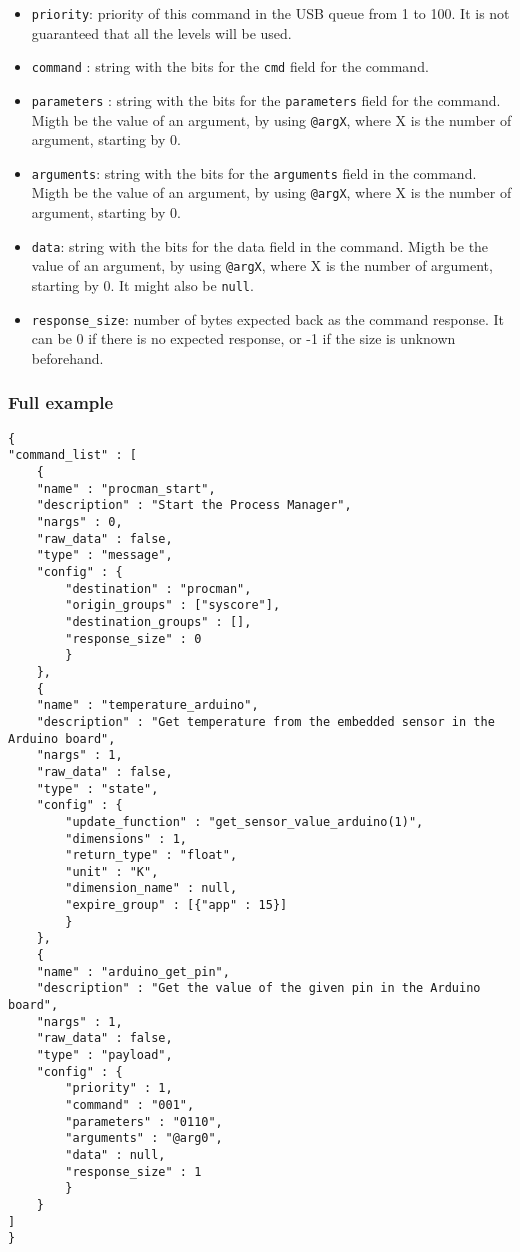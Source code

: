 \documentclass[12pt,a4paper]{report}
\begin{document}
\begin{itemize}
\item \texttt{priority}: priority of this command in the USB queue from 1 to 100. It is not guaranteed that all the levels will be used.
\item \texttt{command} : string with the bits for the \texttt{cmd} field for the command.
\item \texttt{parameters} : string with the bits for the \texttt{parameters} field for the command. Migth be the value of an argument, by using \texttt{@argX}, where X is the number of argument, starting by 0.
\item \texttt{arguments}: string with the bits for the \texttt{arguments} field in the command. Migth be the value of an argument, by using \texttt{@argX}, where X is the number of argument, starting by 0.
\item \texttt{data}: string with the bits for the data field in the command. Migth be the value of an argument, by using \texttt{@argX}, where X is the number of argument, starting by 0. It might also be \texttt{null}.
\item \texttt{response\_size}: number of bytes expected back as the command response. It can be 0 if there is no expected response, or -1 if the size is unknown beforehand.
\end{itemize}

\subsubsection*{Full example}
\begin{lstlisting}
{
"command_list" : [
    {
    "name" : "procman_start",
    "description" : "Start the Process Manager",
    "nargs" : 0,
    "raw_data" : false,
    "type" : "message",
    "config" : {
        "destination" : "procman",
        "origin_groups" : ["syscore"],
        "destination_groups" : [],
        "response_size" : 0
        }
    },
    {
    "name" : "temperature_arduino",
    "description" : "Get temperature from the embedded sensor in the Arduino board",
    "nargs" : 1,
    "raw_data" : false,
    "type" : "state",
    "config" : {
        "update_function" : "get_sensor_value_arduino(1)",
        "dimensions" : 1,
        "return_type" : "float",
        "unit" : "K",
        "dimension_name" : null,
        "expire_group" : [{"app" : 15}]
        }
    },
    {
    "name" : "arduino_get_pin",
    "description" : "Get the value of the given pin in the Arduino board",
    "nargs" : 1,
    "raw_data" : false,
    "type" : "payload",
    "config" : {
        "priority" : 1,
        "command" : "001",
        "parameters" : "0110",
        "arguments" : "@arg0",
        "data" : null,
        "response_size" : 1
        }
    }
]
}           
\end{lstlisting}
\end{document}
